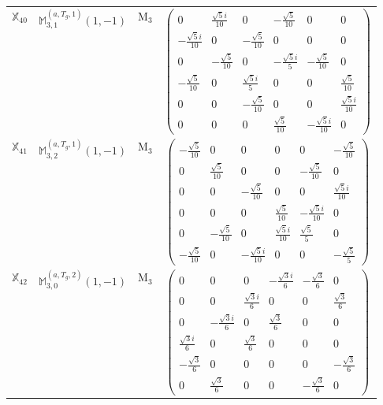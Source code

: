 \documentclass[fleqn,10pt,landscape]{article}
\begin{document}
\begin{itemize}
\begin{center}
\begin{longtable}{c|c|c|c}
$ \mathbb{X}_{40} $ & $\mathbb{M}_{3,1}^{(a,T_{g},1)}(1,-1)$ & M$_{3}$ & $\begin{pmatrix} 0 & \frac{\sqrt{5} i}{10} & 0 & - \frac{\sqrt{5}}{10} & 0 & 0 \\ - \frac{\sqrt{5} i}{10} & 0 & - \frac{\sqrt{5}}{10} & 0 & 0 & 0 \\ 0 & - \frac{\sqrt{5}}{10} & 0 & - \frac{\sqrt{5} i}{5} & - \frac{\sqrt{5}}{10} & 0 \\ - \frac{\sqrt{5}}{10} & 0 & \frac{\sqrt{5} i}{5} & 0 & 0 & \frac{\sqrt{5}}{10} \\ 0 & 0 & - \frac{\sqrt{5}}{10} & 0 & 0 & \frac{\sqrt{5} i}{10} \\ 0 & 0 & 0 & \frac{\sqrt{5}}{10} & - \frac{\sqrt{5} i}{10} & 0 \end{pmatrix}$ \\
$ \mathbb{X}_{41} $ & $\mathbb{M}_{3,2}^{(a,T_{g},1)}(1,-1)$ & M$_{3}$ & $\begin{pmatrix} - \frac{\sqrt{5}}{10} & 0 & 0 & 0 & 0 & - \frac{\sqrt{5}}{10} \\ 0 & \frac{\sqrt{5}}{10} & 0 & 0 & - \frac{\sqrt{5}}{10} & 0 \\ 0 & 0 & - \frac{\sqrt{5}}{10} & 0 & 0 & \frac{\sqrt{5} i}{10} \\ 0 & 0 & 0 & \frac{\sqrt{5}}{10} & - \frac{\sqrt{5} i}{10} & 0 \\ 0 & - \frac{\sqrt{5}}{10} & 0 & \frac{\sqrt{5} i}{10} & \frac{\sqrt{5}}{5} & 0 \\ - \frac{\sqrt{5}}{10} & 0 & - \frac{\sqrt{5} i}{10} & 0 & 0 & - \frac{\sqrt{5}}{5} \end{pmatrix}$ \\
$ \mathbb{X}_{42} $ & $\mathbb{M}_{3,0}^{(a,T_{g},2)}(1,-1)$ & M$_{3}$ & $\begin{pmatrix} 0 & 0 & 0 & - \frac{\sqrt{3} i}{6} & - \frac{\sqrt{3}}{6} & 0 \\ 0 & 0 & \frac{\sqrt{3} i}{6} & 0 & 0 & \frac{\sqrt{3}}{6} \\ 0 & - \frac{\sqrt{3} i}{6} & 0 & \frac{\sqrt{3}}{6} & 0 & 0 \\ \frac{\sqrt{3} i}{6} & 0 & \frac{\sqrt{3}}{6} & 0 & 0 & 0 \\ - \frac{\sqrt{3}}{6} & 0 & 0 & 0 & 0 & - \frac{\sqrt{3}}{6} \\ 0 & \frac{\sqrt{3}}{6} & 0 & 0 & - \frac{\sqrt{3}}{6} & 0 \end{pmatrix}$ \\

\end{longtable}
\end{center}
\end{itemize}
\end{document}
